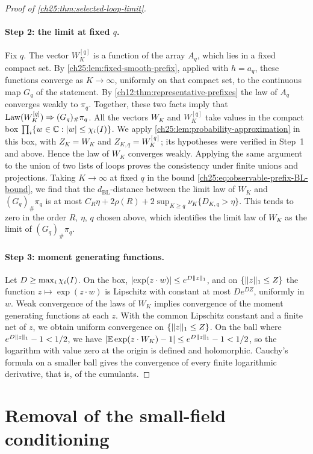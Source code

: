 \begin{proof}[Proof of \cref{ch25:thm:selected-loop-limit}]
\paragraph{Step 2: the limit at fixed $q$.}
Fix $q$. The vector $W_K^{[q]}$ is a function of the array $A_q$, which lies in a fixed compact set. By \cref{ch25:lem:fixed-smooth-prefix}, applied with $h=a_q$, these functions converge as $K\to\infty$, uniformly on that compact set, to the continuous map $G_q$ of the statement. By \cref{ch12:thm:representative-prefixes} the law of $A_q$ converges weakly to $\pi_q$. Together, these two facts imply that $\operatorname{Law}(W_K^{[q]})\Rightarrow(G_q)_\#\pi_q$. All the vectors $W_K$ and $W_K^{[q]}$ take values in the compact box $\prod_i\{w\in\mathbb C:\lvert w\rvert\le\chi_i(I)\}$. We apply \cref{ch25:lem:probability-approximation} in this box, with $Z_K=W_K$ and $Z_{K,q}=W_K^{[q]}$; its hypotheses were verified in Step~1 and above. Hence the law of $W_K$ converges weakly. Applying the same argument to the union of two lists of loops proves the consistency under finite unions and projections. Taking $K\to\infty$ at fixed $q$ in the bound \eqref{ch25:eq:observable-prefix-BL-bound}, we find that the $d_{\mathrm{BL}}$-distance between the limit law of $W_K$ and $(G_q)_\#\pi_q$ is at most $C_R\eta+2\rho(R)+2\sup_{K\ge q}\nu_K\{D_{K,q}>\eta\}$. This tends to zero in the order $R$, $\eta$, $q$ chosen above, which identifies the limit law of $W_K$ as the limit of $(G_q)_\#\pi_q$.

\paragraph{Step 3: moment generating functions.}
Let $D\ge\max_i\chi_i(I)$. On the box, $\lvert \exp(z\cdot w)\rvert\le e^{D\lVert z\rVert_1}$, and on $\{\lVert z\rVert_1\le Z\}$ the function $z\mapsto\exp(z\cdot w)$ is Lipschitz with constant at most $De^{DZ}$, uniformly in $w$. Weak convergence of the laws of $W_K$ implies convergence of the moment generating functions at each $z$. With the common Lipschitz constant and a finite net of $z$, we obtain uniform convergence on $\{\lVert z\rVert_1\le Z\}$. On the ball where $e^{D\lVert z\rVert_1}-1<1/2$, we have $\lvert \mathbb E\exp(z\cdot W_K)-1\rvert\le e^{D\lVert z\rVert_1}-1<1/2$, so the logarithm with value zero at the origin is defined and holomorphic. Cauchy's formula on a smaller ball gives the convergence of every finite logarithmic derivative, that is, of the cumulants.
\end{proof}

\section{Removal of the small-field conditioning}\label{ch25:sec:unconditioning}

